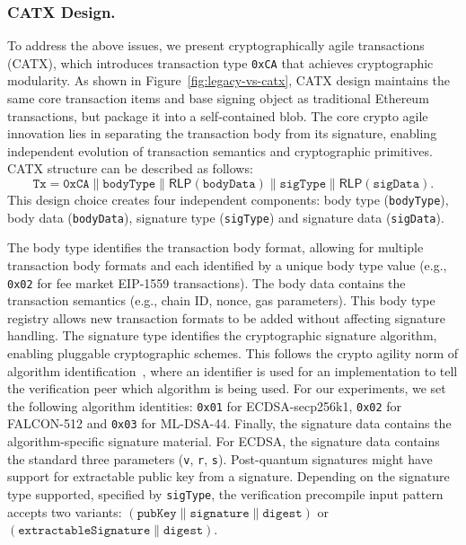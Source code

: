 \subsubsection{CATX Design.}\label{subsubsec:catx-design}

To address the above issues, we present cryptographically agile transactions (CATX), which introduces transaction type \texttt{0xCA} that achieves cryptographic modularity.
As shown in Figure~\ref{fig:legacy-vs-catx}, CATX design maintains the same core transaction items and base signing object as traditional Ethereum transactions, but package it into a self-contained blob.
The core crypto agile innovation lies in separating the transaction body from its signature, enabling independent evolution of transaction semantics and cryptographic primitives. 
CATX structure can be described as follows:
\begin{equation*}
\texttt{Tx} = \texttt{0xCA} \parallel \texttt{bodyType} \parallel \mathsf{RLP}(\texttt{bodyData}) \parallel \texttt{sigType}\parallel \mathsf{RLP}(\texttt{sigData}).
\end{equation*}
This design choice creates four independent components: body type (\texttt{bodyType}), body data (\texttt{bodyData}), signature type (\texttt{sigType}) and signature data (\texttt{sigData}). 

The body type identifies the transaction body format, allowing for multiple transaction body formats and each identified by a unique body type value (e.g., \texttt{0x02} for fee market EIP-1559 transactions). 
The body data contains the transaction semantics (e.g., chain ID, nonce, gas parameters).
This body type registry allows new transaction formats to be added without affecting signature handling.
The signature type identifies the cryptographic signature algorithm, enabling pluggable cryptographic schemes. 
This follows the crypto agility norm of algorithm identification~\cite{NIST:BCC+25}, where an identifier is used for an implementation to tell the verification peer which algorithm is being used. 
For our experiments, we set the following algorithm identities: \texttt{0x01} for ECDSA-secp256k1, \texttt{0x02} for FALCON-512 and \texttt{0x03} for ML-DSA-44.
Finally, the signature data contains the algorithm-specific signature material.
For ECDSA, the signature data contains the standard three parameters (\texttt{v}, \texttt{r}, \texttt{s}). Post-quantum signatures might have support for extractable public key from a signature. 
Depending on the signature type supported, specified by \texttt{sigType}, the verification precompile input pattern accepts two variants: $(\texttt{pubKey} \parallel \texttt{signature} \parallel \texttt{digest})$ or $(\texttt{extractableSignature} \parallel \texttt{digest})$.

